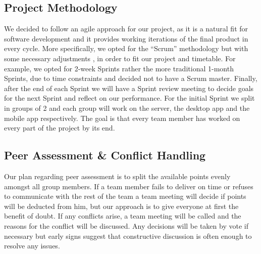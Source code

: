 \documentclass[11pt]{article}
\begin{document}
\subsection{Project Methodology}
We decided to follow an agile approach for our project, as it is a natural fit for software development and it provides working iterations of the final product in every cycle. More specifically, we opted for the “Scrum” methodology but with some necessary adjustments \cite{author-6:18}, in order to fit our project and timetable. For example, we opted for 2-week Sprints rather the more traditional 1-month Sprints, due to time constraints and decided not to have a Scrum master. Finally, after the end of each Sprint we will have a Sprint review meeting to decide goals for the next Sprint and reflect on our performance. For the initial Sprint we split in groups of 2 and each group will work on the server, the desktop app and the mobile app respectively. The goal is that every team member has worked on every part of the project by its end.
	
\subsection{Peer Assessment \& Conflict Handling}
Our plan regarding peer assessment is to split the available points evenly amongst all group members. If a team member fails to deliver on time or refuses to communicate with the rest of the team a team meeting will decide if points will be deducted from him, but our approach is to give everyone at first the benefit of doubt. If any conflicts arise, a team meeting will be called and the reasons for the conflict will be discussed. Any decisions will be taken by vote if necessary but early signs suggest that constructive discussion is often enough to resolve any issues.


\printbibheading[title={References},heading=bibintoc]
\nocite{*}
\printbibliography[keyword=cite,heading=none]
\printbibliography[keyword=nocite,heading=none]

\end{document}
